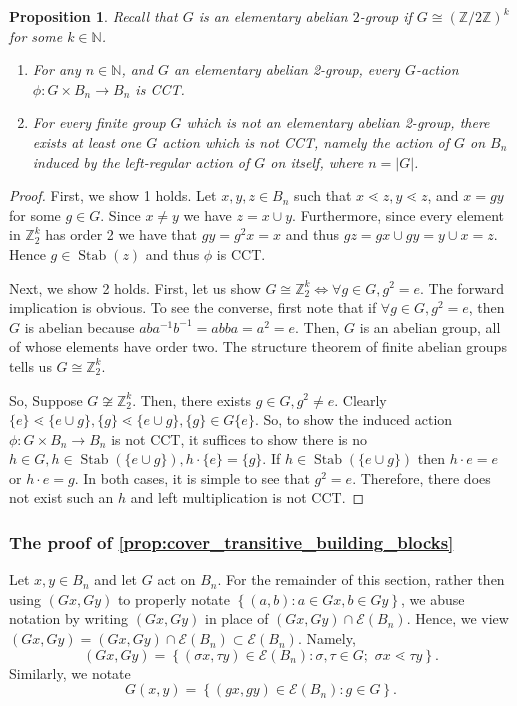 \documentclass[smallextended, envcountsame, numbook]{svjour3}
\theoremstyle{plain}
\newtheorem{prop}[thm]{Proposition}
\theoremstyle{definition}
\theoremstyle{remark}
\numberwithin{equation}{section}
\newcommand\sssec{\subsubsection}
\renewcommand{\iff}{\Leftrightarrow}
\newcommand\Stab{\operatorname{Stab}}
\begin{document}
\begin{prop}
\label{prop:regular_action_CCT}
Recall that $G$ is an elementary abelian $2$-group if $G \cong (\mathbb Z/2\mathbb Z)^k$ for some $k \in \mathbb N$.
\begin{enumerate}
  \item For any $n \in \mathbb N$, and $G$ an elementary abelian 2-group, every $G$-action $\phi:G \times B_n \rightarrow B_n$ is CCT.
  \item For every finite group $G$ which is not an elementary abelian 2-group, there exists at least one $G$ action which is not CCT, namely the action of $G$ on $B_n$ induced by the left-regular action of $G$ on itself, where $n = |G|$.
\end{enumerate}
\end{prop}

\begin{proof}
First, we show 1 holds. Let $x,y,z\in B_n$ such that $x \lessdot z, y \lessdot z$, and  $x = gy$ for some $g\in G$.  Since $x\ne y$ we have $z=x\cup y$.  Furthermore, since every element in $\mathbb Z_2^k$ has order 2 we have that $gy = g^2x = x$ and thus $gz = gx\cup gy = y\cup x = z$. Hence $g\in\Stab(z)$ and thus $\phi$ is CCT.

Next, we show 2 holds. First, let us show $G \cong \mathbb Z_2^k \iff \forall g \in G,g^2 = e$. The forward implication is obvious. To see the converse, first note that if $\forall g \in G, g^2 = e$, then $G$ is abelian because $aba^{-1}b^{-1} = abba = a^2 = e$.  Then, $G$ is an abelian group, all of whose elements have order two. The structure theorem of finite abelian groups tells us $G \cong \mathbb Z_2^k$.

So, Suppose $G \not \cong \mathbb Z_2^k$. Then, there exists $g \in G,g^2 \neq e$. Clearly $\{e\}\lessdot \{e \cup g\},\{g\} \lessdot \{e \cup g\},\{g\} \in G\{e\}$. So, to show the induced action $\phi\colon G \times B_n \rightarrow B_n$ is not CCT, it suffices to show there is no $h \in G,h \in \Stab(\{e \cup g\}),h\cdot \{e\} =\{g\}$.  If $h \in \Stab(\{e \cup g\})$ then $h \cdot e = e$ or $h \cdot e = g$. In both cases, it is simple to see that $g^2 = e$. Therefore, there does not exist such an $h$ and left multiplication is not CCT.
\end{proof}

\sssec{The proof of \ref{prop:cover_transitive_building_blocks}}
\label{sssec:dihedral}\indent 

Let $x, y \in B_n$ and let $G$ act on $B_n$. For the remainder of this section, rather then using $(Gx, Gy)$ to properly notate $\left\{ (a,b): a \in Gx, b \in Gy \right\}$,
we abuse notation by writing $(Gx, Gy)$ in place of $(Gx, Gy) \cap  \mathcal E(B_n)$. Hence, we view $(Gx, Gy) = (Gx, Gy) \cap  \mathcal E(B_n)\subset  \mathcal E(B_n)$. Namely, $$(Gx, Gy) = \left\{ (\sigma x, \tau y) \in  \mathcal E (B_n) : \sigma, \tau \in G; \, \, \sigma x \lessdot \tau y  \right\}.$$ Similarly, we notate $$G(x, y) = \left\{ (gx , g y) \in  \mathcal E (B_n) \colon g \in G \right\}.$$
\end{document}
